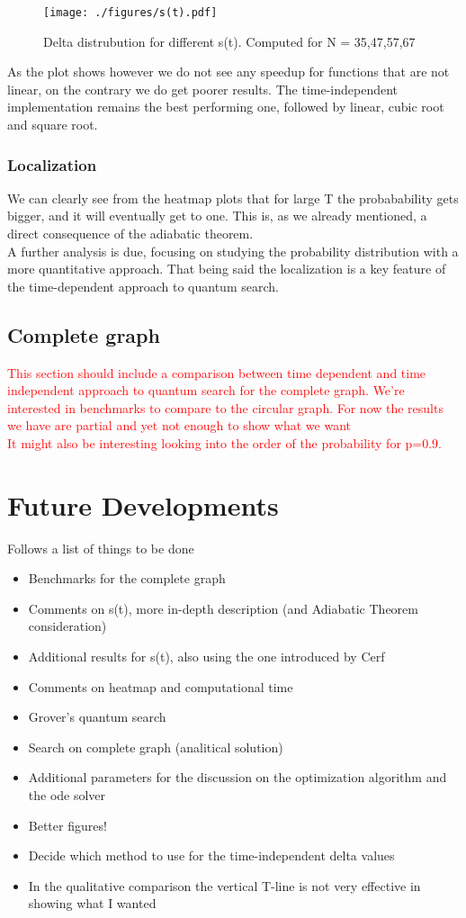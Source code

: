 \documentclass[aps,pra,reprint, onecolumn]{revtex4-2}
\newcommand{\red}[1]{\textcolor{red}{#1}}
\begin{document}
\begin{figure}[ht]
\texttt{[image: ./figures/s(t).pdf]}
\caption{Delta distrubution for different s(t). Computed for N = 35,47,57,67}
\end{figure}

As the plot shows however we do not see any speedup for functions that are not linear, on the contrary we do get poorer results. The time-independent implementation remains the best performing one, followed by linear, cubic root and square root.

\subsubsection{\textbf{Localization}}
We can clearly see from the heatmap plots that for large T the probabability gets bigger, and it will eventually get to one. This is, as we already mentioned, a direct consequence of the adiabatic theorem. \\ A further analysis is due, focusing on studying the probability distribution with a more quantitative approach. That being said the localization is a key feature of the time-dependent approach to quantum search.

\subsection{Complete graph}
\red{This section should include a comparison between time dependent and time independent approach to quantum search for the complete graph. We're interested in benchmarks to compare to the circular graph. For now the results we have are partial and yet not enough to show what we want\\ It might also be interesting looking into the order of the probability for p=0.9.}
\section{Future Developments}
Follows a list of things to be done
\begin{itemize}
	\item Benchmarks for the complete graph
	\item Comments on s(t), more in-depth description (and Adiabatic Theorem consideration)
	\item Additional results for s(t), also using the one introduced by Cerf
	\item Comments on heatmap and computational time
	\item Grover's quantum search
	\item Search on complete graph (analitical solution)
	\item Additional parameters for the discussion on the optimization algorithm and the ode solver
	\item Better figures!
	\item Decide which method to use for the time-independent delta values
	\item In the qualitative comparison the vertical T-line is not very effective in showing what I wanted

\end{itemize}
\clearpage
\end{document}
